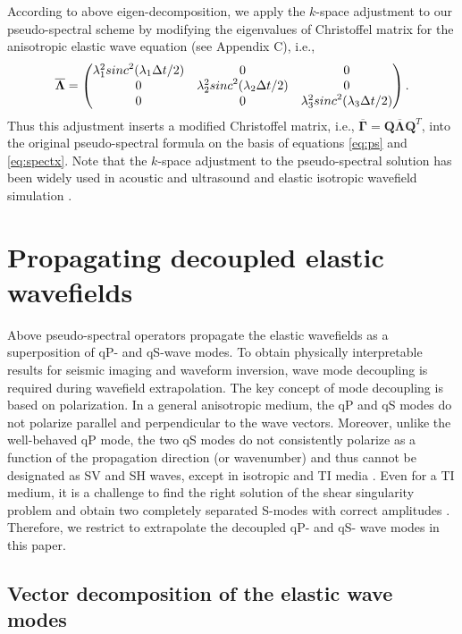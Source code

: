 According to above eigen-decomposition, we apply the $k$-space adjustment to our
pseudo-spectral scheme by modifying the eigenvalues
of Christoffel matrix for the anisotropic elastic wave equation (see Appendix C), i.e.,
\begin{equation}
\label{eq:lambda1}
\overline{\mathbf{\Lambda}}=
\begin{pmatrix}{\lambda^2_1}{sinc}^2(\lambda_1{\Delta{t}/2}) & 0 &0 \cr 
	0 & {\lambda^2_2}{sinc}^2(\lambda_2{\Delta{t}/2}) & 0\cr
	0 & 0 & {\lambda^2_3}{sinc}^2(\lambda_3{\Delta{t}/2})\end{pmatrix}.
\end{equation}
Thus this adjustment inserts a modified Christoffel matrix, i.e.,
$\overline{\mathbf{\Gamma}} = \mathbf{Q}\overline{\mathbf{\Lambda}}{\mathbf{Q}^{T}}$,
into the original pseudo-spectral formula on the basis of equations \ref{eq:ps} and \ref{eq:spectx}.
Note that the $k$-space adjustment to the pseudo-spectral solution has been widely used in acoustic and ultrasound \cite[]{bojarski:1982,tabei:2002}
and elastic isotropic wavefield simulation \cite[]{liu:1995,firouzi:2012}.

\section{Propagating decoupled elastic wavefields}

Above pseudo-spectral operators propagate the elastic wavefields as a superposition of qP- and qS-wave modes.
To obtain physically interpretable results for seismic imaging and waveform inversion, wave
mode decoupling is required during wavefield extrapolation.
The key concept of mode decoupling is based on polarization.
In a general anisotropic medium, the qP and qS
modes do not polarize parallel and perpendicular to the wave vectors.
Moreover, unlike the well-behaved qP mode, the two qS modes do not consistently polarize as a
function of the propagation direction (or wavenumber) and
thus cannot be designated as SV and SH waves, except in isotropic and TI media
\cite[]{winterstein,crampin:1991}.
Even for a TI medium, it is a challenge to find the right solution of the shear singularity problem and
obtain two completely separated S-modes with correct amplitudes
\cite[]{yan.sava:2011,cheng.fomel:2014}.
Therefore, we restrict to extrapolate the decoupled qP- and qS- wave modes in this paper.

\subsection{Vector decomposition of the elastic wave modes}

